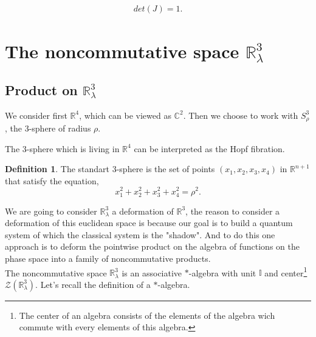 \documentclass[a4paper,11pt]{article} %
\numberwithin{equation}{section} %
\numberwithin{figure}{section} %
\theoremstyle{plain} %
\theoremstyle{definition} %
\newtheorem{dfn}{Definition}[section]
\theoremstyle{remark} %
\begin{document}
\begin{eqnarray}
 det \left( J \right) = 1.
\end{eqnarray}

\section{The noncommutative space $\mathbb{R}^{3}_{\lambda}$}

\subsection*{Product on $\mathbb{R}^{3}_{\lambda}$}

\noindent
We consider first $\mathbb{R}^{4}$, which can be viewed as $\mathbb{C}^{2}$. Then we choose to work with $S^3_\rho$, the 3-sphere of radius $\rho$.




\noindent
The 3-sphere which is living in $\mathbb{R}^{4}$ can be interpreted as the Hopf fibration.
\begin{dfn}
 The standart 3-sphere is the set of points $(x_1,x_2,x_3,x_4)$ in $\mathbb{R}^{n+1}$ that satisfy the equation,
 \begin{equation*}
  x_1^2 + x_2^2 + x_3^2 + x_4^2 = \rho^2.
 \end{equation*}
\end{dfn}




We are going to consider $\mathbb{R}^{3}_{\lambda}$ a deformation of $\mathbb{R}^{3}$, the reason to consider a deformation of this euclidean space is because our goal is to build a quantum system of which the classical system is the "shadow". And to do this one approach is to deform the pointwise product on the algebra of functions on the phase space into a family of noncommutative products.\\ The noncommutative space $\mathbb{R}^{3}_{\lambda}$ is an associative $*$-algebra with unit $\mathbb{I}$ and center\footnote{The center of an algebra consists of the elements of the algebra wich commute with every elements of this algebra.} $\mathcal{Z}(\mathbb{R}^{3}_{\lambda})$. Let's recall the definition of a $*$-algebra.
\\
\end{document}
